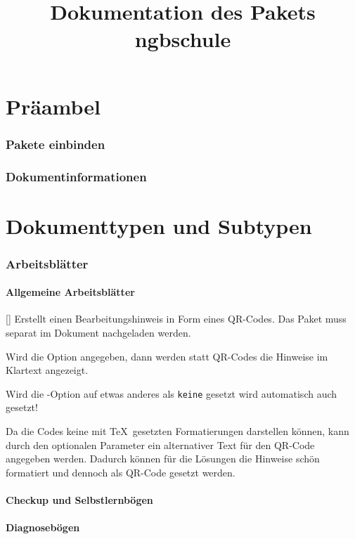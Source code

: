 \documentclass[a4paper,add-index,ngerman]{cnltx-doc}
\title{Dokumentation des Pakets ngbschule}
\begin{document}


\part{Präambel}
\section{Pakete einbinden}
\section{Dokumentinformationen}



\part{Dokumenttypen und Subtypen}
\section{Arbeitsblätter}
\subsection{Allgemeine Arbeitsblätter}
\begin{commands}
	[]
	Erstellt einen Bearbeitungshinweis in Form eines QR-Codes. Das Paket  muss separat im Dokument nachgeladen werden.
	
	Wird die Option  angegeben, dann werden statt QR-Codes die Hinweise im Klartext angezeigt.
	
	Wird die -Option  auf etwas anderes als \texttt{keine} gesetzt wird automatisch auch  gesetzt!
	
	Da die Codes keine mit \TeX\ gesetzten Formatierungen darstellen können, kann durch den optionalen Parameter  ein alternativer Text für den QR-Code angegeben werden. Dadurch können für die Lösungen die Hinweise schön formatiert und dennoch als QR-Code gesetzt werden.
\end{commands}

\subsection{Checkup und Selbstlernbögen}
\subsection{Diagnosebögen}
\end{document}
